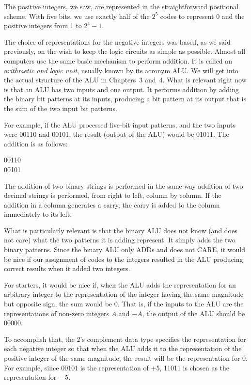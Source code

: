 \documentclass{patt}
\begin{document}
The positive integers, we saw, are represented in the straightforward
positional scheme.  With five bits, we use exactly half of the $2^5$
codes to represent 0 and the positive integers from 1 to $2^4-1$.

The choice of representations for the negative integers was based, as
we said previously, on the wish to keep the logic circuits as simple
as possible.  Almost all computers use the same basic mechanism to perform
addition.  It is called an \textit{arithmetic and logic unit}, usually
known by its acronym ALU.  We will get into the actual structure of
the ALU in Chapters~3 and~4. What is relevant right now is that an ALU
has two inputs and one output.  It performs addition by adding the
binary bit patterns at its inputs, producing a bit pattern at its
output that is the sum of the two input bit patterns.

For example, if the ALU processed five-bit input patterns, and
the two inputs were 00110 and 00101, the result (output of
the ALU) would be 01011.  The addition is as follows:

\begin{cctable}
00110\\
00101\\
\end{cctable}

The addition of two binary strings is performed in the same way
addition of two decimal strings is performed, from right to left,
column by column.  If the addition in a column generates a carry, the
carry is added to the column immediately to its left.

What is particularly relevant is that the binary ALU does not know
(and does not care) what the two patterns it is adding represent.  It
simply adds the two binary patterns.  Since the binary ALU only ADDs
and does not CARE, it would be nice if our assignment of codes to the integers 
resulted in the ALU producing correct results when it added two integers.

For starters, it would be nice if, when the ALU adds the representation for 
an arbitrary integer to the representation of the integer having the same 
magnitude but opposite sign, the sum would be 0.  That is, if the inputs to
the ALU are the representations of non-zero integers $A$ and $-A$, the
output of the ALU should be 00000.

To accomplish that, the 2's complement data type specifies the
representation for each negative integer so that when the ALU adds it
to the representation of the positive integer of the same magnitude,
the result will be the representation for 0.  For example, since 00101
is the representation of $+$5, 11011 is chosen as the representation
for~$-$5.
\end{document}
